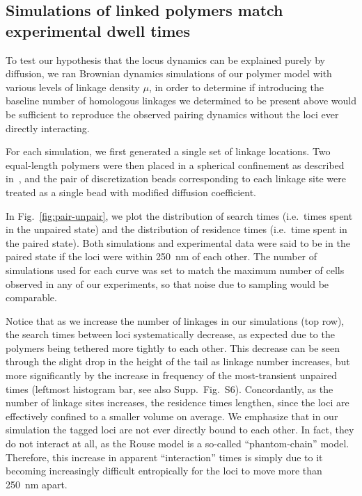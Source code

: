 \documentclass[9pt,twocolumn,twoside,lineno]{pnas-new}
\begin{document}
\subsection*{Simulations of linked polymers match experimental dwell times}

To test our hypothesis that the locus dynamics can be explained purely by diffusion, we ran Brownian dynamics simulations of our polymer model with various levels of linkage density $\mu$, in order to determine if introducing the baseline number of homologous linkages we determined to be present above would be sufficient to reproduce the observed pairing dynamics without the loci ever directly interacting.

For each simulation, we first generated a single set of linkage locations.
Two equal-length polymers were then placed in a spherical confinement as described in~\cite{weber2010}, and the pair of discretization beads corresponding to each linkage site were treated as a single bead with modified diffusion coefficient.

In Fig.~\ref{fig:pair-unpair}, we plot the distribution of search times (i.e.\ times spent in the unpaired state) and the distribution of residence times (i.e.\ time spent in the paired state). Both simulations and experimental data were said to be in the paired state if the loci were within \SI{250}{\nano\meter} of each other. The number of simulations used for each curve was set to match the maximum number of cells observed in any of our experiments, so that noise due to sampling would be comparable.

Notice that as we increase the number of linkages in our simulations (top row), the search times between loci systematically decrease, as expected due to the polymers being tethered more tightly to each other.
This decrease can be seen through the slight drop in the height of the tail as linkage number increases, but more significantly by the increase in frequency of the most-transient unpaired times (leftmost histogram bar, see also Supp.\ Fig.\ S6).
Concordantly, as the number of linkage sites increases, the residence times lengthen, since the loci are effectively confined to a smaller volume on average.
We emphasize that in our simulation the tagged loci are not ever directly bound to each other. In fact, they do not interact at all, as the Rouse model is a so-called ``phantom-chain'' model. Therefore, this increase in apparent ``interaction'' times is simply due to it becoming increasingly difficult entropically for the loci to move more than \SI{250}{\nano\meter} apart.
\end{document}
